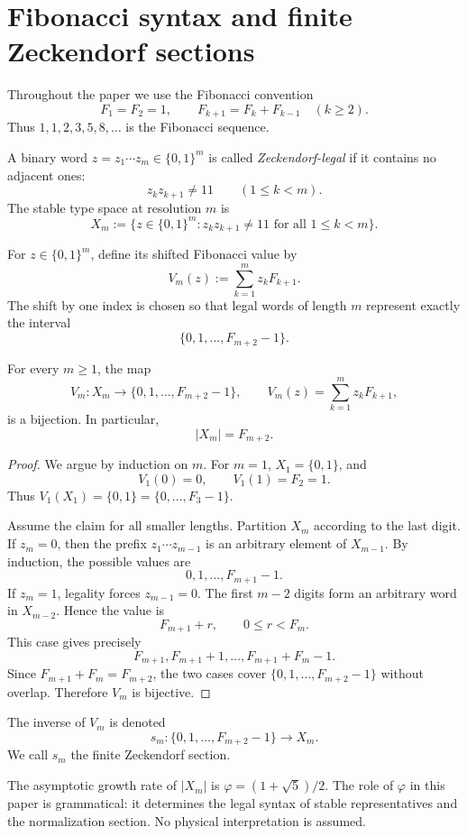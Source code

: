 \section{Fibonacci syntax and finite Zeckendorf sections}
\label{sec:golden-syntax}

Throughout the paper we use the Fibonacci convention
\[
F_1=F_2=1,\qquad F_{k+1}=F_k+F_{k-1}\quad(k\ge2).
\]
Thus \(1,1,2,3,5,8,\ldots\) is the Fibonacci sequence.

A binary word \(z=z_1\cdots z_m\in\{0,1\}^m\) is called \emph{Zeckendorf-legal} if it contains no adjacent ones:
\[
z_kz_{k+1}\ne 11\qquad(1\le k<m).
\]
The stable type space at resolution \(m\) is
\[
X_m:=\{z\in\{0,1\}^m:z_kz_{k+1}\ne 11\text{ for all }1\le k<m\}.
\]

For \(z\in\{0,1\}^m\), define its shifted Fibonacci value by
\[
V_m(z):=\sum_{k=1}^{m}z_kF_{k+1}.
\]
The shift by one index is chosen so that legal words of length \(m\) represent exactly the interval
\[
\{0,1,\ldots,F_{m+2}-1\}.
\]

\begin{lemma}
\label{lem:finite-zeckendorf-section}
For every \(m\ge1\), the map
\[
V_m:X_m\to\{0,1,\ldots,F_{m+2}-1\},
\qquad
V_m(z)=\sum_{k=1}^{m}z_kF_{k+1},
\]
is a bijection.  In particular,
\[
|X_m|=F_{m+2}.
\]
\end{lemma}

\begin{proof}
We argue by induction on \(m\).  For \(m=1\), \(X_1=\{0,1\}\), and
\[
V_1(0)=0,\qquad V_1(1)=F_2=1.
\]
Thus \(V_1(X_1)=\{0,1\}=\{0,\ldots,F_3-1\}\).

Assume the claim for all smaller lengths.  Partition \(X_m\) according to the last digit.  If \(z_m=0\), then the prefix \(z_1\cdots z_{m-1}\) is an arbitrary element of \(X_{m-1}\).  By induction, the possible values are
\[
0,1,\ldots,F_{m+1}-1.
\]
If \(z_m=1\), legality forces \(z_{m-1}=0\).  The first \(m-2\) digits form an arbitrary word in \(X_{m-2}\).  Hence the value is
\[
F_{m+1}+r,\qquad 0\le r<F_m.
\]
This case gives precisely
\[
F_{m+1},F_{m+1}+1,\ldots,F_{m+1}+F_m-1.
\]
Since \(F_{m+1}+F_m=F_{m+2}\), the two cases cover \(\{0,1,\ldots,F_{m+2}-1\}\) without overlap.  Therefore \(V_m\) is bijective.
\end{proof}

\begin{definition}
\label{def:finite-zeckendorf-section}
The inverse of \(V_m\) is denoted
\[
s_m:\{0,1,\ldots,F_{m+2}-1\}\to X_m.
\]
We call \(s_m\) the finite Zeckendorf section.
\end{definition}

\begin{remark}
The asymptotic growth rate of \(|X_m|\) is \(\varphi=(1+\sqrt5)/2\).  The role of \(\varphi\) in this paper is grammatical: it determines the legal syntax of stable representatives and the normalization section.  No physical interpretation is assumed.
\end{remark}
